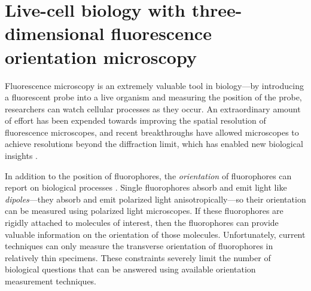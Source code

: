 \documentclass[11pt]{article}
\begin{document}
\section*{Live-cell biology with three-dimensional fluorescence orientation
  microscopy}
Fluorescence microscopy is an extremely valuable tool in biology---by
introducing a fluorescent probe into a live organism and measuring the position
of the probe, researchers can watch cellular processes as they occur. An
extraordinary amount of effort has been expended towards improving the spatial
resolution of fluorescence microscopes, and recent breakthroughs have allowed
microscopes to achieve resolutions beyond the diffraction limit, which has
enabled new biological insights \cite{nobel}.

In addition to the position of fluorophores, the \textit{orientation} of
fluorophores can report on biological processes \cite{weiss1999}. Single
fluorophores absorb and emit light like \textit{dipoles}---they absorb and emit
polarized light anisotropically---so their orientation can be measured using
polarized light microscopes. If these fluorophores are rigidly attached to
molecules of interest, then the fluorophores can provide valuable information on
the orientation of those molecules. Unfortunately, current techniques can only
measure the transverse orientation of fluorophores in relatively thin
specimens. These constraints severely limit the number of biological questions
that can be answered using available orientation measurement techniques.
\end{document}
